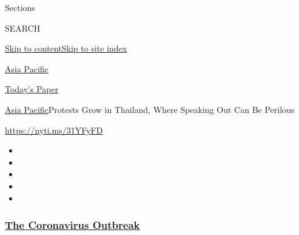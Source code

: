 Sections

SEARCH

\protect\hyperlink{site-content}{Skip to
content}\protect\hyperlink{site-index}{Skip to site index}

\href{https://www.nytimes3xbfgragh.onion/section/world/asia}{Asia
Pacific}

\href{https://myaccount.nytimes3xbfgragh.onion/auth/login?response_type=cookie\&client_id=vi}{}

\href{https://www.nytimes3xbfgragh.onion/section/todayspaper}{Today's
Paper}

\href{/section/world/asia}{Asia Pacific}\textbar{}Protests Grow in
Thailand, Where Speaking Out Can Be Perilous

\url{https://nyti.ms/31YFyFD}

\begin{itemize}
\item
\item
\item
\item
\item
\end{itemize}

\hypertarget{the-coronavirus-outbreak}{%
\subsubsection{\texorpdfstring{\href{https://www.nytimes3xbfgragh.onion/news-event/coronavirus?name=styln-coronavirus-national\&region=TOP_BANNER\&block=storyline_menu_recirc\&action=click\&pgtype=Article\&impression_id=8079f0b0-f52d-11ea-af4d-233cac0e4b1b\&variant=undefined}{The
Coronavirus
Outbreak}}{The Coronavirus Outbreak}}\label{the-coronavirus-outbreak}}

